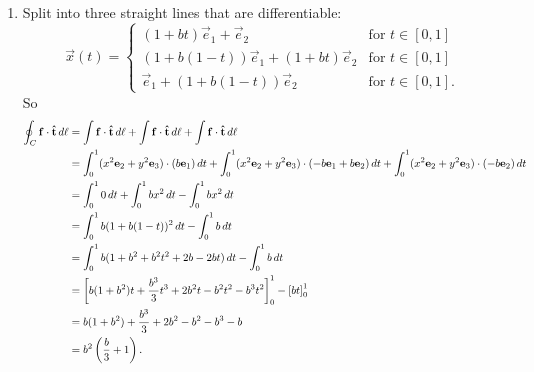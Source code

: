 \documentclass[10pt, a4paper]{article}
\begin{document}
\begin{problem}[$2015$ question $8$]
\begin{solution}
\begin{enumerate}[label = (\alph*)]
            \item
            Split into three straight lines that are differentiable:
            \[
            \vec{x}(t) = \begin{cases}
                (1 + bt)\vec{e}_1 + \vec{e}_2 &\text{for } t \in [0, 1] \\
                (1 + b(1 -t))\vec{e}_1 + (1 + bt)\vec{e}_2 &\text{for } t \in [0, 1] \\
                \vec{e}_1 + (1 + b(1 -t))\vec{e}_2 &\text{for } t \in [0, 1].
            \end{cases}
            \]
            So
            \begin{align*}
                \oint_{C}\mathbf{f}\cdot\mathbf{\hat{t}}\,d\ell &= \int\mathbf{f}\cdot\mathbf{\hat{t}}\,d\ell + \int\mathbf{f}\cdot\mathbf{\hat{t}}\,d\ell + \int\mathbf{f}\cdot\mathbf{\hat{t}}\,d\ell \\
                &= \int_{0}^{1}(x ^ 2\mathbf{e}_2 + y ^ 2\mathbf{e}_3)\cdot(b\mathbf{e}_1)\,dt + \int_{0}^{1}(x ^ 2\mathbf{e}_2 + y ^ 2\mathbf{e}_3)\cdot(-b\mathbf{e}_1 + b\mathbf{e}_2)\,dt + \int_{0}^{1}(x ^ 2\mathbf{e}_2 + y ^ 2\mathbf{e}_3)\cdot(-b\mathbf{e}_2)\,dt \\
                &= \int_{0}^{1}0\,dt + \int_{0}^{1}bx ^ 2\,dt - \int_{0}^{1}bx ^ 2\,dt \\
                &= \int_{0}^{1}b(1 + b(1 - t)) ^ 2\,dt - \int_{0}^{1}b\,dt \\
                &= \int_{0}^{1}b(1 + b ^ 2 + b ^ 2t ^ 2 + 2b - 2bt)\,dt - \int_{0}^{1}b\,dt \\
                &= \left[b(1 + b ^ 2)t + \frac{b ^ 3}{3}t ^ 3 + 2b ^ 2t - b ^ 2t ^ 2 - b ^ 3t ^ 2\right]_{0}^{1} - \left[bt\right]_{0}^{1} \\
                &= b(1 + b ^ 2) + \frac{b ^ 3}{3} + 2b ^ 2 - b ^ 2 - b ^ 3 - b \\
                &= b ^ 2\left(\frac{b}{3} + 1\right).
            \end{align*}
        \end{enumerate}
    \end{solution}
\end{problem}
\end{document}
